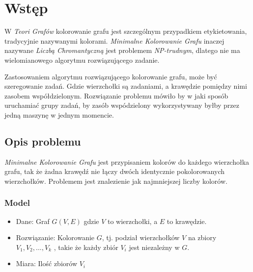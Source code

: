 \chapter{Wstęp}
\thispagestyle{chapterBeginStyle}
\label{rozdzial1}

W \textit{Teori Grafów} kolorowanie grafu jest szczególnym przypadkiem etykietowania, tradycyjnie nazywanymi kolorami. 
\textit{Minimalne Kolorowanie Grafu} inaczej nazywane \textit{Liczbą Chromantyczną} jest problemem \textit{NP-trudnym}\cite{NP}, dlatego nie ma wielomianowego algorytmu rozwiązującego zadanie. 

Zastosowaniem algorytmu rozwiązującego kolorowanie grafu, może być szeregowanie zadań. 
Gdzie wierzchołki są zadaniami, a krawędzie pomiędzy nimi zasobem współdzielonym.
Rozwiązanie problemu mówiło by w jaki sposób uruchamiać grupy zadań,
by zasób wspódzielony wykorzystywany byłby przez jedną maszynę w jednym momencie.

\section{Opis problemu}
\textit{Minimalne Kolorowanie Grafu} jest przypisaniem kolorów do każdego wierzchołka grafu, tak że żadna krawędź nie łączy dwóch identycznie pokolorowanych wierzchołków.
Problemem jest znalezienie jak najmniejszej liczby kolorów.

\subsection{Model}
\begin{itemize}
    \item Dane: Graf $G(V, E)$ gdzie $V$ to wierzchołki, a $E$ to krawędzie. 
    \item Rozwiązanie: Kolorowanie $G$, tj. podział wierzchołków $V$ na zbiory $V_1, V_2, ..., V_k$  , takie że każdy zbiór $V_i$ jest niezależny w $G$.
    \item Miara: Ilość zbiorów $V_i$
\end{itemize}

